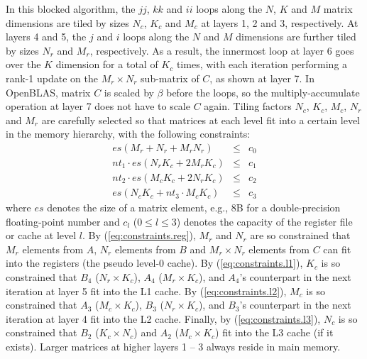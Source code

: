 In this blocked algorithm, the $jj$, $kk$ and $ii$ loops
along the $N$, $K$ and $M$ matrix dimensions are
tiled by sizes $N_c$, $K_c$ and $M_c$ at layers 1, 2 and 3, respectively.
At layers 4 and 5, the $j$ and $i$ loops along the $N$ and $M$ dimensions
are further tiled by sizes $N_r$ and $M_r$, respectively.
As a result, the innermost loop at layer 6 goes over the $K$
dimension for a total of $K_c$ times,
with each iteration performing a rank-1 update on
the $M_r \times N_r$ sub-matrix of $C$, as shown at layer 7.
In OpenBLAS, matrix $C$ is scaled by $\beta$ before the loops,
so the multiply-accumulate operation at layer 7 does not have to scale $C$ again.
Tiling factors $N_c$, $K_c$, $M_c$, $N_r$ and $M_r$ are carefully selected so that
matrices at each level fit into a certain level in the memory hierarchy, with the following
constraints:
\begin{eqnarray}
  es (M_r + N_r + M_r N_r) & \le & c_{0} \label{eq:constraints.reg}\\
  nt_{1} \cdot es (N_r K_c + 2 M_r K_c) & \le & c_{1} \label{eq:constraints.l1}\\
  nt_{2} \cdot es (M_c K_c + 2 N_r K_c) & \le & c_{2} \label{eq:constraints.l2}\\
  es (N_c K_c + nt_{3} \cdot M_c K_c)   & \le & c_{3} \label{eq:constraints.l3}
\end{eqnarray}
where $es$ denotes the size of a matrix element,
e.g., 8B for a double-precision floating-point number
and $c_l$ ($0\leqslant l \leqslant 3$) denotes the capacity of the register file or cache at level $l$.
By (\ref{eq:constraints.reg}), $M_r$ and $N_r$ are so
constrained that $M_r$ elements from $A$,
$N_r$ elements from $B$ and $M_r \times N_r$ elements from $C$ can
fit into the registers (the pseudo level-0 cache).
By (\ref{eq:constraints.l1}), $K_c$ is so constrained that $B_4$ ($N_r \times K_c$),
$A_4$ ($M_r \times K_c$), and $A_4$'s counterpart in the next iteration
at layer 5 fit into the L1 cache.
By (\ref{eq:constraints.l2}), $M_c$ is so constrained that $A_3$ ($M_c \times K_c$),
$B_3$ ($N_r \times K_c$), and $B_3$'s counterpart in the next iteration
at layer 4 fit into the L2 cache.
Finally, by (\ref{eq:constraints.l3}), $N_c$ is so constrained that 
$B_2$ ($K_c \times N_c$) and $A_2$ ($M_c \times K_c$) fit into the L3 cache (if it exists).
Larger matrices at higher layers 1 -- 3 always reside in main memory.


